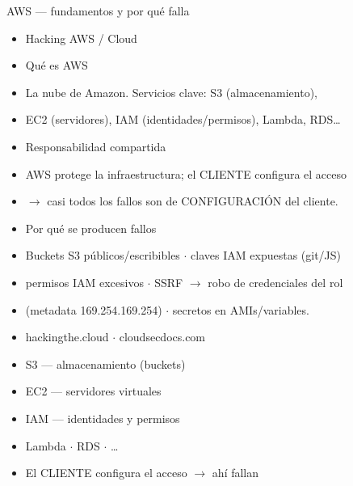 \documentclass[aspectratio=169,10pt]{beamer}
\begin{document}
\begin{frame}[allowframebreaks]{AWS --- fundamentos y por qué falla}
\small
  \begin{itemize}
  \item Hacking AWS / Cloud
  \item Qué es AWS
  \item La nube de Amazon. Servicios clave: S3 (almacenamiento),
  \item EC2 (servidores), IAM (identidades/permisos), Lambda, RDS\dots{}
  \item Responsabilidad compartida
  \item AWS protege la infraestructura; el CLIENTE configura el acceso
  \item $\rightarrow$ casi todos los fallos son de CONFIGURACIÓN del cliente.
  \item Por qué se producen fallos
  \item Buckets S3 públicos/escribibles $\cdot$ claves IAM expuestas (git/JS)
  \item permisos IAM excesivos $\cdot$ SSRF $\rightarrow$ robo de credenciales del rol
  \item (metadata 169.254.169.254) $\cdot$ secretos en AMIs/variables.
  \item hackingthe.cloud $\cdot$ cloudsecdocs.com
  \item S3 --- almacenamiento (buckets)
  \item EC2 --- servidores virtuales
  \item IAM --- identidades y permisos
  \item Lambda $\cdot$ RDS $\cdot$ \dots{}
  \item El CLIENTE configura el acceso $\rightarrow$ ahí fallan
  \end{itemize}
\end{frame}
\end{document}
